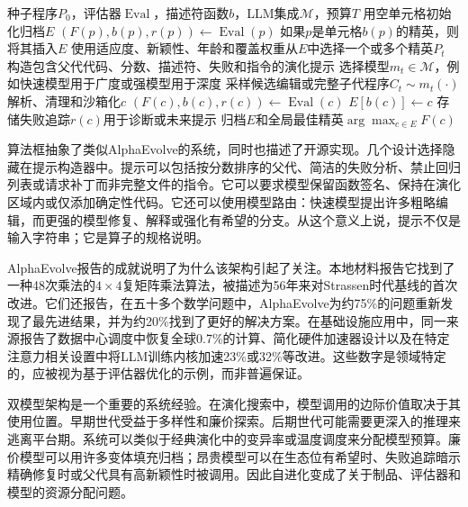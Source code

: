 \begin{algorithm}[t]
\caption{用于演化式代码发现的LLM引导MAP-Elites}
\label{alg:llm-map-elites}
\begin{algorithmic}[1]
\REQUIRE 种子程序$P_0$，评估器$\operatorname{Eval}$，描述符函数$b$，LLM集成$\mathcal{M}$，预算$T$
\STATE 用空单元格初始化归档$E$
  \STATE $(F(p), b(p), r(p)) \leftarrow \operatorname{Eval}(p)$
  \STATE 如果$p$是单元格$b(p)$的精英，则将其插入$E$
\ENDFOR
{}
  \STATE 使用适应度、新颖性、年龄和覆盖权重从$E$中选择一个或多个精英$P_t$
  \STATE 构造包含父代代码、分数、描述符、失败和指令的演化提示
  \STATE 选择模型$m_t\in\mathcal{M}$，例如快速模型用于广度或强模型用于深度
  \STATE 采样候选编辑或完整子代程序$C_t\sim m_t(\cdot)$
    \STATE 解析、清理和沙箱化$c$
    \STATE $(F(c), b(c), r(c))\leftarrow \operatorname{Eval}(c)$
      \STATE $E[b(c)]\leftarrow c$
    \ELSE
      \STATE 存储失败追踪$r(c)$用于诊断或未来提示
    \ENDIF
  \ENDFOR
\ENDFOR
\RETURN 归档$E$和全局最佳精英$\arg\max_{c\in E}F(c)$
\end{algorithmic}
\end{algorithm}

算法框抽象了类似AlphaEvolve的系统，同时也描述了开源实现。几个设计选择隐藏在提示构造器中。提示可以包括按分数排序的父代、简洁的失败分析、禁止回归列表或请求补丁而非完整文件的指令。它可以要求模型保留函数签名、保持在演化区域内或仅添加确定性代码。它还可以使用模型路由：快速模型提出许多粗略编辑，而更强的模型修复、解释或强化有希望的分支。从这个意义上说，提示不仅是输入字符串；它是算子的规格说明。

AlphaEvolve报告的成就说明了为什么该架构引起了关注。本地材料报告它找到了一种48次乘法的$4\times4$复矩阵乘法算法，被描述为56年来对Strassen时代基线的首次改进。它们还报告，在五十多个数学问题中，AlphaEvolve为约75\%的问题重新发现了最先进结果，并为约20\%找到了更好的解决方案。在基础设施应用中，同一来源报告了数据中心调度中恢复全球0.7\%的计算、简化硬件加速器设计以及在特定注意力相关设置中将LLM训练内核加速23\%或32\%等改进。这些数字是领域特定的，应被视为基于评估器优化的示例，而非普遍保证。

双模型架构是一个重要的系统经验。在演化搜索中，模型调用的边际价值取决于其使用位置。早期世代受益于多样性和廉价探索。后期世代可能需要更深入的推理来逃离平台期。系统可以类似于经典演化中的变异率或温度调度来分配模型预算。廉价模型可以用许多变体填充归档；昂贵模型可以在生态位有希望时、失败追踪暗示精确修复时或父代具有高新颖性时被调用。因此自进化变成了关于制品、评估器和模型的资源分配问题。

